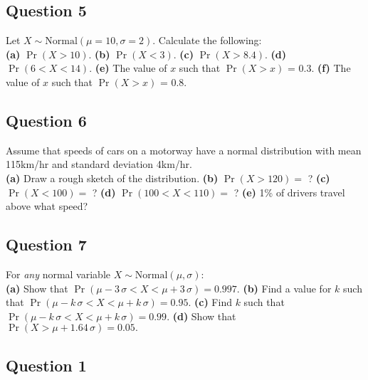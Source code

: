 
\subsection*{Question 5}
Let $X \sim \text{Normal}(\mu=10,\sigma=2)$. Calculate the following:\\[-0.2cm]

{\bf(a)} $\Pr(X>10)$. 
{\bf(b)} $\Pr(X<3)$. 
{\bf(c)} $\Pr(X>8.4)$. 
{\bf(d)} $\Pr(6<X<14)$. 
{\bf(e)} The value of $x$ such that $\Pr(X>x)$ = 0.3. 
{\bf(f)} The value of $x$ such that $\Pr(X>x)$ = 0.8.




\subsection*{Question 6}
Assume that speeds of cars on a motorway have a normal distribution with mean 115km/hr and standard deviation 4km/hr.\\[-0.2cm]

{\bf(a)} Draw a rough sketch of the distribution. 
{\bf(b)} $\Pr(X>120)=$ ? 
{\bf(c)} $\Pr(X<100)=$ ? 
{\bf(d)} $\Pr(100<X<110)=$ ? 
{\bf(e)} 1\% of drivers travel above what speed?






\subsection*{Question 7}
For \emph{any} normal variable $X \sim \text{Normal}(\mu,\sigma)$:\\[-0.2cm]

{\bf(a)} Show that $\Pr(\mu-3\,\sigma<X<\mu+3\,\sigma) = 0.997$. 
{\bf(b)} Find a value for $k$ such that $\Pr(\mu-k\,\sigma<X<\mu+k\,\sigma) = 0.95$. 
{\bf(c)} Find $k$ such that $\Pr(\mu-k\,\sigma<X<\mu+k\,\sigma) = 0.99$. 
{\bf(d)} Show that $\Pr(X>\mu+1.64\,\sigma) = 0.05.$



\subsection*{Question 1}

